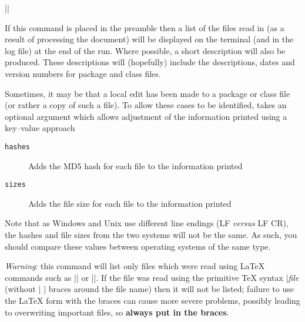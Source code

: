 \documentclass{ltxguide}
\begin{document}
\begin{decl}
  |\listfiles| 
\end{decl}

If this command is placed in the preamble then a list of the files
read in (as a result of processing the document) will be displayed
on the terminal (and in the log file) at the end of the run. Where
possible, a short description will also be produced. These descriptions
will (hopefully) include the descriptions, dates and version numbers
for package and class files.

Sometimes, it may be that a local edit has been made to a package or
class file (or rather a copy of such a file). To allow these cases to
be identified,  takes an optional argument which allows
adjustment of the information printed using a key--value approach
\begin{description}
  \item[\texttt{hashes}] Adds the MD5 hash for each file to the
    information printed
  \item[\texttt{sizes}] Adds the file size for each file to the
    information printed
\end{description}
Note that as Windows and Unix use different line endings (LF \emph{versus} LF
CR), the hashes and file sizes from the two systems will not be the same. As
such, you should compare these values between operating systems of the same
type.

\emph{Warning}: this command will list only files which were read
using \LaTeX{} commands such as || or
||.  If the file was read using the primitive \TeX{}
syntax |\emph{file} (without |{ }| braces around the file name)
then it will not be listed; failure to use the \LaTeX{} form with the
braces can cause more severe problems, possibly leading to overwriting
important files, so \textbf{always put in the braces}.
\end{document}
